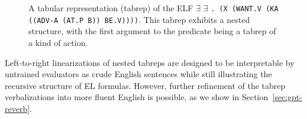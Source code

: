 \begin{figure}
    \centering
    {
    \setlength{\fboxsep}{2pt}
    }
    \caption{A tabular representation (tabrep) of the ELF $\exists$  $\exists$  \texttt{. (X (WANT.V (KA ((ADV-A (AT.P B)) BE.V))))}. This tabrep exhibits a nested structure, with the first argument to the predicate  being a tabrep of a kind of action.}
    \label{fig:tabrep}
\end{figure}

Left-to-right linearizations of nested tabreps are designed to be interpretable by untrained evaluators as crude English sentences while still illustrating the recursive structure of EL formulas. However, further refinement of the tabrep verbalizations into more fluent English is possible, as we show in Section~\ref{sec:gpt-reverb}.

